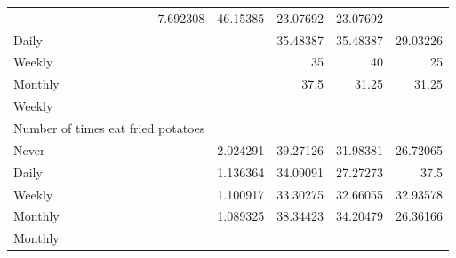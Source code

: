 \documentclass{article}
\begin{document}
\begin{table}[!h]
{\begin{tabular}{lllll}
			\multicolumn{1}{|r}{7.692308} &
			\multicolumn{1}{r}{46.15385} &
			\multicolumn{1}{r}{23.07692} &
			\multicolumn{1}{r}{23.07692} \\
			\multicolumn{1}{l}{\hspace{5em}Daily} &
			\multicolumn{1}{|r}{} &
			\multicolumn{1}{r}{35.48387} &
			\multicolumn{1}{r}{35.48387} &
			\multicolumn{1}{r}{29.03226} \\
			\multicolumn{1}{l}{\hspace{5em}Weekly} &
			\multicolumn{1}{|r}{} &
			\multicolumn{1}{r}{35} &
			\multicolumn{1}{r}{40} &
			\multicolumn{1}{r}{25} \\
			\multicolumn{1}{l}{\hspace{5em}Monthly} &
			\multicolumn{1}{|r}{} &
			\multicolumn{1}{r}{37.5} &
			\multicolumn{1}{r}{31.25} &
			\multicolumn{1}{r}{31.25} \\
			\multicolumn{1}{l}{\hspace{3em}Weekly} &
			\multicolumn{1}{|r}{} &
			\multicolumn{1}{r}{} &
			\multicolumn{1}{r}{} &
			\multicolumn{1}{r}{} \\
			\multicolumn{1}{l}{\hspace{4em}Number of times eat fried potatoes} &
			\multicolumn{1}{|r}{} &
			\multicolumn{1}{r}{} &
			\multicolumn{1}{r}{} &
			\multicolumn{1}{r}{} \\
			\multicolumn{1}{l}{\hspace{5em}Never} &
			\multicolumn{1}{|r}{2.024291} &
			\multicolumn{1}{r}{39.27126} &
			\multicolumn{1}{r}{31.98381} &
			\multicolumn{1}{r}{26.72065} \\
			\multicolumn{1}{l}{\hspace{5em}Daily} &
			\multicolumn{1}{|r}{1.136364} &
			\multicolumn{1}{r}{34.09091} &
			\multicolumn{1}{r}{27.27273} &
			\multicolumn{1}{r}{37.5} \\
			\multicolumn{1}{l}{\hspace{5em}Weekly} &
			\multicolumn{1}{|r}{1.100917} &
			\multicolumn{1}{r}{33.30275} &
			\multicolumn{1}{r}{32.66055} &
			\multicolumn{1}{r}{32.93578} \\
			\multicolumn{1}{l}{\hspace{5em}Monthly} &
			\multicolumn{1}{|r}{1.089325} &
			\multicolumn{1}{r}{38.34423} &
			\multicolumn{1}{r}{34.20479} &
			\multicolumn{1}{r}{26.36166} \\
			\multicolumn{1}{l}{\hspace{3em}Monthly} &
			\multicolumn{1}{|r}{} &
			\multicolumn{1}{r}{} &
			\multicolumn{1}{r}{} &

\end{tabular}}
\end{table}
\end{document}
